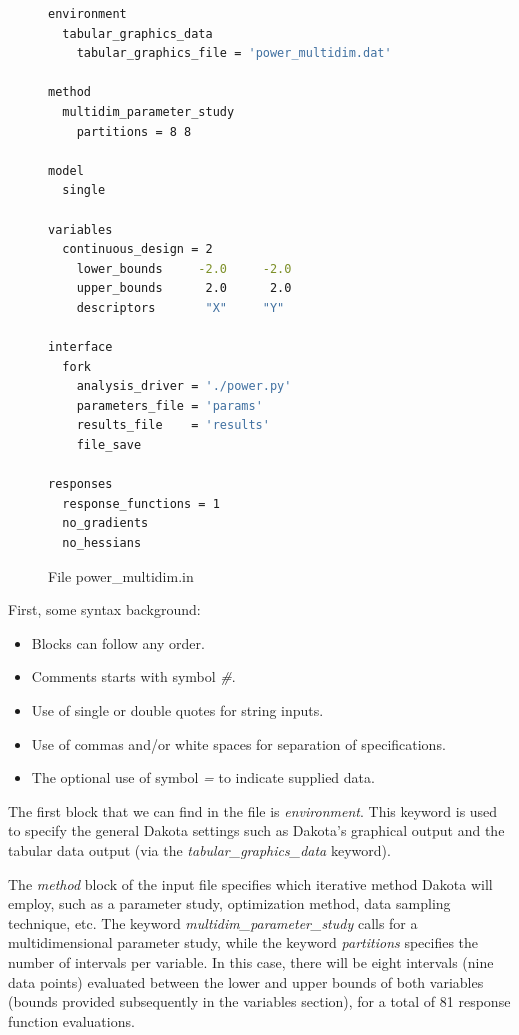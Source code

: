 \documentclass[12pt,a4paper,article]{memoir}
\begin{document}
\begin{figure}[htb!]
\begin{lstlisting}[style=MyCodeStyle,language=bash]
environment
  tabular_graphics_data
    tabular_graphics_file = 'power_multidim.dat'

method
  multidim_parameter_study
    partitions = 8 8

model
  single

variables
  continuous_design = 2
    lower_bounds     -2.0     -2.0
    upper_bounds      2.0      2.0
    descriptors       "X"     "Y"

interface
  fork
    analysis_driver = './power.py'
    parameters_file = 'params'
    results_file    = 'results'
    file_save

responses
  response_functions = 1
  no_gradients
  no_hessians
\end{lstlisting}
\caption{File power\_multidim.in}
\label{fig:PoMuCode}
\end{figure}

First, some syntax background:

\begin{itemize}
\item Blocks can follow any order.
\item Comments starts with symbol \textit{\#}.
\item Use of single or double quotes for string inputs.
\item Use of commas and/or white spaces for separation of specifications.
\item The optional use of symbol \textit{=} to indicate supplied data.
\end{itemize}

The first block that we can find in the file is \textit{environment}. This keyword is used to specify the general Dakota settings such as Dakota's graphical output and the tabular data output (via the \textit{tabular\_graphics\_data} keyword).

The \textit{method} block of the input file specifies which iterative method Dakota will employ, such as a parameter study, optimization method, data sampling technique, etc. The keyword \textit{multidim\_parameter\_study} calls for a multidimensional parameter study, while the keyword \textit{partitions} specifies the number of intervals per variable. In this case, there will be eight intervals (nine data points) evaluated between the lower and upper bounds of both variables (bounds provided subsequently in the variables section), for a total of 81 response function evaluations.
\end{document}
